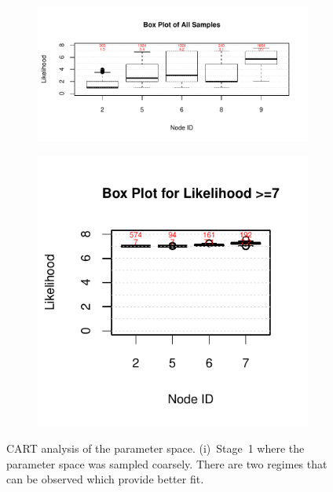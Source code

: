 \documentclass[11pt]{article}
\theoremstyle{definition}
\begin{document}
\begin{figure}[ht]
\begin{subfigure}[b]{.48\textwidth}
    \caption{\label{fig:cart2}}
    \end{subfigure}
    \begin{subfigure}[b]{.48\textwidth}
    \includegraphics[width=\textwidth]{figs/cart_box1.pdf}
    \caption{\label{fig:cartBox1}}
    \end{subfigure}
    \begin{subfigure}[b]{.48\textwidth}
    \includegraphics[width=\textwidth]{figs/cart_box2.pdf}
    \caption{\label{fig:cartBox2}}
    \end{subfigure}
    \caption{CART analysis of the parameter space. (i)~Stage~1 where the
        parameter space was sampled coarsely. There are two regimes
    that can be observed which provide better fit.}
\end{figure}
\end{document}
